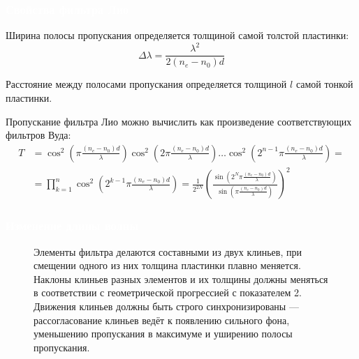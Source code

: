 \documentclass[aspectratio=169]{beamer}
\begin{document}
\begin{frame}
\frametitle{\textcolor{white}{Свойства фильтра Лио}}
Ширина полосы пропускания определяется толщиной самой толстой пластинки:
\begin{equation*}
    \Delta \lambda = \frac{\lambda^2}{2 (n_e - n_0) d}
\end{equation*}

Расстояние между полосами пропускания определяется толщиной $l$ самой тонкой пластинки.

Пропускание фильтра Лио можно вычислить как произведение соответствующих фильтров Вуда:
\begin{align*}
    T &= \cos^2 \left( \pi \frac{(n_e - n_0)d}{\lambda} \right) \cos^2 \left( 2 \pi \frac{(n_e - n_0)d}{\lambda} \right) \ldots \cos^2 \left( 2^{n - 1} \pi \frac{(n_e - n_0)d}{\lambda} \right) = \\
    &=\prod_{k = 1}^{n} \cos^2 \left( 2^{k - 1} \pi \frac{(n_e - n_0)d}{\lambda} \right) = \frac{1}{2^{2N}} \left(\frac{\sin \left( 2^N  \pi \frac{(n_e - n_0)d}{\lambda} \right)}{\sin \left(\pi \frac{(n_e - n_0)d}{\lambda} \right)}\right)^2
\end{align*}
\end{frame}

\begin{frame}
\frametitle{\textcolor{white}{Изменение длины волны}}
\begin{figure}[h]
\begin{minipage}[h]{0.49\linewidth}
Элементы фильтра делаются составными из двух клиньев, при смещении
одного из них толщина пластинки плавно меняется. Наклоны клиньев разных элементов и их толщины должны меняться в соответствии с геометрической прогрессией с показателем 2. Движения клиньев должны быть строго синхронизированы — рассогласование клиньев ведёт к появлению сильного фона, уменьшению пропускания в максимуме и уширению полосы пропускания.
\end{minipage}
\begin{minipage}[h]{0.49\linewidth}
\end{minipage}
\end{figure}


\end{frame}
\end{document}
